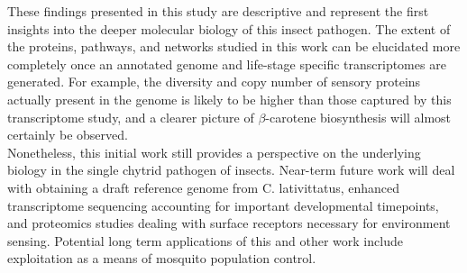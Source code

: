 \indent These findings presented in this study are descriptive and represent the first insights into the deeper molecular biology of this insect pathogen. The extent of the proteins, pathways, and networks studied in this work can be elucidated more completely once an annotated genome and life-stage specific transcriptomes are generated. For example, the diversity and copy number of sensory proteins actually present in the genome is likely to be higher than those captured by this transcriptome study, and a clearer picture of $\beta$-carotene biosynthesis will almost certainly be observed. \\
\indent Nonetheless, this initial work still provides a perspective on the underlying biology in the single chytrid pathogen of insects. Near-term future work will deal with obtaining a draft reference genome from C. lativittatus, enhanced transcriptome sequencing accounting for important developmental timepoints, and proteomics studies dealing with surface receptors necessary for environment sensing. Potential long term applications of this and other work include exploitation as a means of mosquito population control. \\

